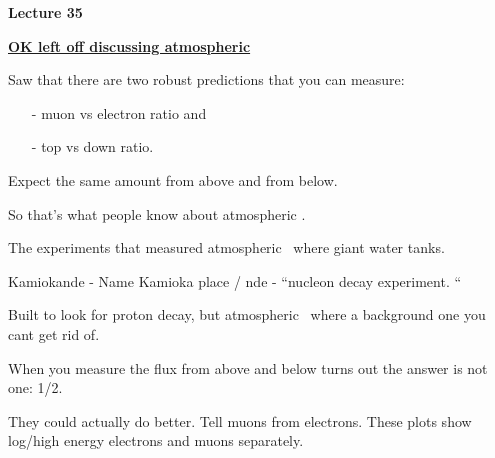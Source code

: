 \usepackage{fancyhdr}

\fancyhf{}


\thispagestyle{fancy}

\begin{center}
{\huge \textbf{Lecture 35}}
\end{center}

{\fontsize{14}{16}\selectfont

\textbf{\underline{OK left off discussing atmospheric \nus}} 

Saw that there are two robust predictions that you can measure:
\begin{itemize}
\item[-]muon vs electron ratio and
\item[-]top vs down ratio. 
\end{itemize}

Expect the same amount from above and from below.

So that's what people know about atmospheric \nus. 

The experiments that measured atmospheric \nus\ where giant water tanks.

Kamiokande - Name Kamioka place / nde - ``nucleon decay experiment. ``

Built to look for proton decay, but atmospheric \nus\ where a background one you cant get rid of. 

When you measure the flux from above and below turns out the answer is not one: 1/2.

They could actually do better. 
Tell muons from electrons.
These plots show log/high energy electrons and muons separately. 
\clearpage

}
